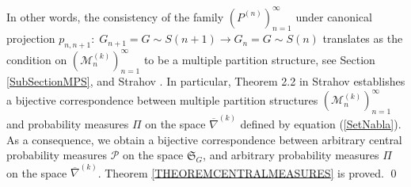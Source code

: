 \documentclass[12pt]{amsart}
\theoremstyle{definition}
\numberwithin{equation}{section}
\begin{document}
In other words, the consistency of the family $\left(P^{(n)}\right)_{n=1}^{\infty}$
under canonical projection $p_{n,n+1}:\; G_{n+1}=G\sim S(n+1)\longrightarrow G_n=G\sim S(n)$
translates as the condition on $\left(\mathcal{M}_n^{(k)}\right)_{n=1}^{\infty}$ to be a  multiple partition structure, see Section \ref{SubSectionMPS}, and  Strahov \cite{StrahovMPS}. In particular, Theorem 2.2 in Strahov \cite{StrahovMPS} establishes a bijective correspondence between multiple partition structures  $\left(\mathcal{M}_n^{(k)}\right)_{n=1}^{\infty}$ and probability measures $\Pi$ on the space $\overline{\nabla}^{(k)}$ defined by equation (\ref{SetNabla}).
As a consequence, we obtain a bijective correspondence between arbitrary central probability measures $\mathcal{P}$ on the space $\mathfrak{S}_{G}$, and arbitrary probability measures $\Pi$ on the space
$\overline{\nabla}^{(k)}$. Theorem \ref{THEOREMCENTRALMEASURES} is proved.
\qed
\end{document}
